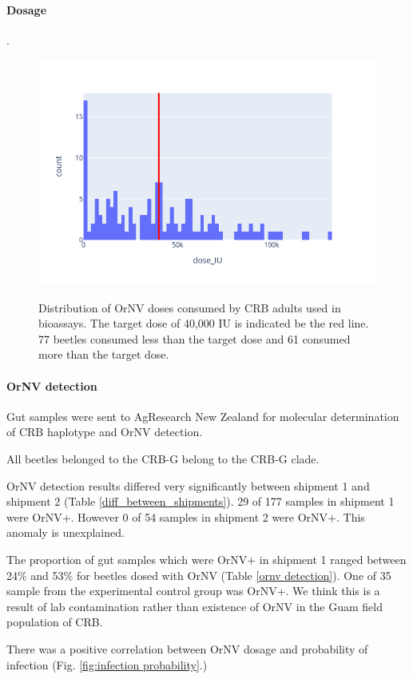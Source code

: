 \documentclass[12pt,letterpaper,english,bibliography=totocnumbered, abstract=on]{scrartcl}
\begin{document}
\clearpage

\paragraph{Dosage}.

\begin{figure}[h]
	\centering
	\caption{Distribution of OrNV doses consumed by CRB adults used in bioassays. The target dose of 40,000 IU is indicated be the red line. 77 beetles consumed less than the target dose and 61 consumed more than the target dose.}
	\includegraphics[width=0.7\linewidth]{images/dosage_distribution}
	\label{fig:dosagedistribution}
\end{figure}



\paragraph{OrNV detection}

Gut samples were sent to AgResearch New Zealand for molecular determination of CRB haplotype and OrNV detection. 

All beetles belonged to the CRB-G belong to the CRB-G clade.

OrNV detection results differed very significantly between shipment 1 and shipment 2 (Table \ref{diff_between_shipments}). 29 of 177 samples in shipment 1 were OrNV+. However 0 of 54 samples in shipment 2 were OrNV+. This anomaly is unexplained.

The proportion of gut samples which were OrNV+ in shipment 1 ranged between 24\% and 53\% for beetles dosed with OrNV (Table \ref{ornv detection}). One of 35 sample from the experimental control group was OrNV+. We think this is a result of lab contamination rather than existence of OrNV in the Guam field population of CRB.

There was a positive correlation between OrNV dosage and probability of infection (Fig. \ref{fig:infection probability}.)
\end{document}
